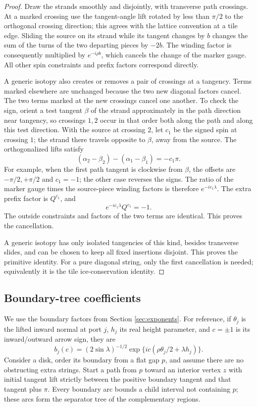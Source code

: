\begin{proof}
Draw the strands smoothly and disjointly, with transverse path
crossings. At a marked crossing use the tangent-angle lift rotated
by less than $\pi/2$ to the orthogonal crossing direction; this
agrees with the lattice convention at a tile edge. Sliding the
source on its strand while its tangent changes by $b$ changes the
sum of the turns of the two departing pieces by $-2b$.
The winding factor is consequently multiplied by $e^{-i\rho b}$,
which cancels the change of the marker gauge. All other spin
constraints and prefix factors correspond directly.

A generic isotopy also creates or removes a pair of crossings at
a tangency. Terms marked elsewhere are unchanged because the
two new diagonal factors cancel. The two terms marked at the
new crossings cancel one another. To check the sign, orient a
test tangent $\beta$ of the strand approximately in the path
direction near tangency, so crossings $1,2$ occur in that order
both along the path and along this test direction. With the
source at crossing $2$, let $c_1$ be the signed spin at crossing
$1$; the strand there travels opposite to $\beta$, away from the
source. The orthogonalized lifts satisfy
\begin{equation}\label{cur:tangency-lift}
 (\alpha_2-\beta_2)-(\alpha_1-\beta_1)=-c_1\pi.
\end{equation}
For example, when the first path tangent is clockwise from
$\beta$, the offsets are $-\pi/2,+\pi/2$ and $c_1=-1$; the other
case reverses the signs. The ratio of the marker gauge times
the source-piece winding factors is therefore $e^{-ic_1\lambda}$.
The extra prefix factor is $Q^{c_1}$, and
\[
 e^{-ic_1\lambda}Q^{c_1}=-1.
\]
The outside constraints and factors of the two terms are
identical. This proves the cancellation.

A generic isotopy has only isolated tangencies of this kind,
besides transverse slides, and can be chosen to keep all fixed
insertions disjoint. This proves the primitive identity. For a
pure diagonal string, only the first cancellation is needed;
equivalently it is the tile ice-conservation identity.
\end{proof}

\subsection{Boundary-tree coefficients}

We use the boundary factors from Section \ref{sec:exponents}.
For reference, if $\theta_j$ is the lifted inward normal at port
$j$, $h_j$ its real height parameter, and $c=\pm1$ is its
inward/outward arrow sign, they are
\[
 b_j(c)=(2\sin\lambda)^{-1/2}
       \exp\{ic(\rho\theta_j/2+\lambda h_j)\}.
\]
Consider a disk, order its boundary from a flat gap $p$, and
assume there are no obstructing extra strings. Start a path from
$p$ toward an interior vertex $z$ with initial tangent lift
strictly between the positive boundary tangent and that tangent
plus $\pi$. Every boundary arc bounds a child interval not
containing $p$; these arcs form the separator tree of the
complementary regions.


